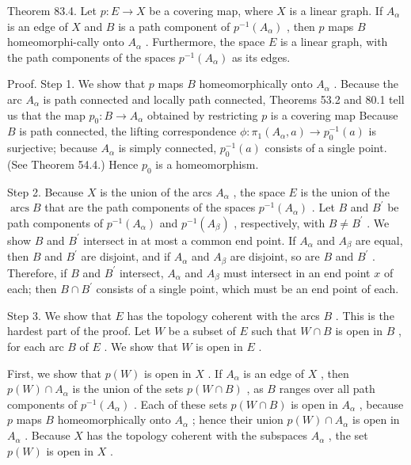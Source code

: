 Theorem 83.4. Let \(p : E \rightarrow  X\) be a covering map, where \(X\) is a linear graph. If \({A}_{\alpha }\) is an edge of \(X\) and \(B\) is a path component of \({p}^{-1}\left( {A}_{\alpha }\right)\) , then \(p\) maps \(B\) homeomorphi-cally onto \({A}_{\alpha }\) . Furthermore, the space \(E\) is a linear graph, with the path components of the spaces \({p}^{-1}\left( {A}_{\alpha }\right)\) as its edges.

Proof. Step 1. We show that \(p\) maps \(B\) homeomorphically onto \({A}_{\alpha }\) . Because the arc \({A}_{\alpha }\) is path connected and locally path connected, Theorems 53.2 and 80.1 tell us that the map \({p}_{0} : B \rightarrow  {A}_{\alpha }\) obtained by restricting \(p\) is a covering map Because \(B\) is path connected, the lifting correspondence \(\phi  : {\pi }_{1}\left( {{A}_{\alpha },a}\right)  \rightarrow  {p}_{0}^{-1}\left( a\right)\) is surjective; because \({A}_{\alpha }\) is simply connected, \({p}_{0}^{-1}\left( a\right)\) consists of a single point. (See Theorem 54.4.) Hence \({p}_{0}\) is a homeomorphism.

Step 2. Because \(X\) is the union of the arcs \({A}_{\alpha }\) , the space \(E\) is the union of the \(\operatorname{arcs}B\) that are the path components of the spaces \({p}^{-1}\left( {A}_{\alpha }\right)\) . Let \(B\) and \({B}^{\prime }\) be path components of \({p}^{-1}\left( {A}_{\alpha }\right)\) and \({p}^{-1}\left( {A}_{\beta }\right)\) , respectively, with \(B \neq  {B}^{\prime }\) . We show \(B\) and \({B}^{\prime }\) intersect in at most a common end point. If \({A}_{\alpha }\) and \({A}_{\beta }\) are equal, then \(B\) and \({B}^{\prime }\) are disjoint, and if \({A}_{\alpha }\) and \({A}_{\beta }\) are disjoint, so are \(B\) and \({B}^{\prime }\) . Therefore, if \(B\) and \({B}^{\prime }\) intersect, \({A}_{\alpha }\) and \({A}_{\beta }\) must intersect in an end point \(x\) of each; then \(B \cap  {B}^{\prime }\) consists of a single point, which must be an end point of each.

Step 3. We show that \(E\) has the topology coherent with the arcs \(B\) . This is the hardest part of the proof. Let \(W\) be a subset of \(E\) such that \(W \cap  B\) is open in \(B\) , for each arc \(B\) of \(E\) . We show that \(W\) is open in \(E\) .

First, we show that \(p\left( W\right)\) is open in \(X\) . If \({A}_{\alpha }\) is an edge of \(X\) , then \(p\left( W\right)  \cap  {A}_{\alpha }\) is the union of the sets \(p\left( {W \cap  B}\right)\) , as \(B\) ranges over all path components of \({p}^{-1}\left( {A}_{\alpha }\right)\) . Each of these sets \(p\left( {W \cap  B}\right)\) is open in \({A}_{\alpha }\) , because \(p\) maps \(B\) homeomorphically onto \({A}_{\alpha }\) ; hence their union \(p\left( W\right)  \cap  {A}_{\alpha }\) is open in \({A}_{\alpha }\) . Because \(X\) has the topology coherent with the subspaces \({A}_{\alpha }\) , the set \(p\left( W\right)\) is open in \(X\) .


